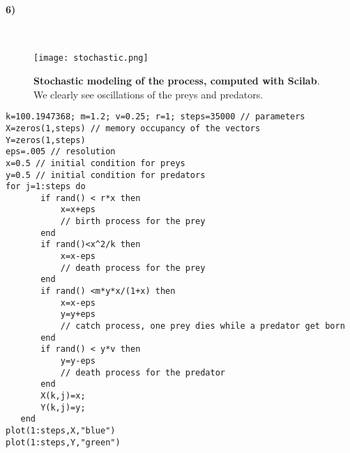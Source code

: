 \documentclass{article}
\begin{document}
\newpage
\paragraph{6)}
\
\begin{figure}[H]
	  \centering
  	\texttt{[image: stochastic.png]}
  	\caption{\textbf{Stochastic modeling of the process, computed with Scilab}. We clearly see oscillations of the preys and predators.}
	\end{figure}
\begin{lstlisting}
k=100.1947368; m=1.2; v=0.25; r=1; steps=35000 // parameters
X=zeros(1,steps) // memory occupancy of the vectors
Y=zeros(1,steps)
eps=.005 // resolution
x=0.5 // initial condition for preys
y=0.5 // initial condition for predators
for j=1:steps do
       if rand() < r*x then 
           x=x+eps
           // birth process for the prey
       end
       if rand()<x^2/k then
           x=x-eps
           // death process for the prey
       end
       if rand() <m*y*x/(1+x) then 
           x=x-eps
           y=y+eps
           // catch process, one prey dies while a predator get born
       end
       if rand() < y*v then 
           y=y-eps 
           // death process for the predator
       end
       X(k,j)=x;
       Y(k,j)=y;
   end
plot(1:steps,X,"blue")
plot(1:steps,Y,"green")
\end{lstlisting}
\end{document}
